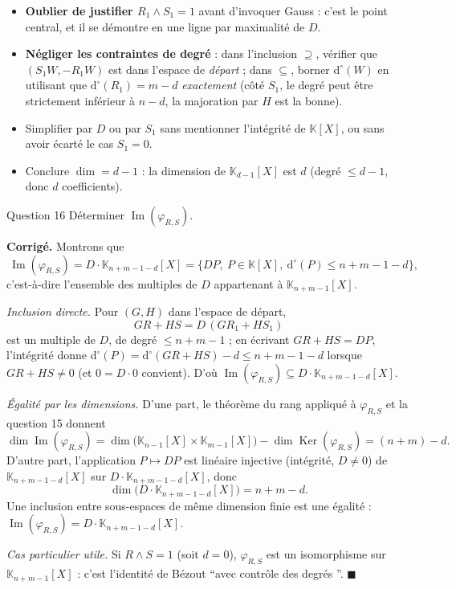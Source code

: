 \documentclass[11pt,a4paper]{article}
\newenvironment{corrige}
  {\par\medskip\noindent
   \begin{tcolorbox}[blanker, breakable,
     borderline west={2.5pt}{0pt}{vertP},
     left=10pt, top=2pt, bottom=2pt]
   {\color{vertP}\bfseries Corrigé.}\hspace{0.5em}\ignorespaces}
  {\hfill$\blacksquare$\end{tcolorbox}\medskip}
\newcommand{\og}{``}
\newcommand{\fg}{''}
\newcommand{\K}{\mathbb{K}}
\newcommand{\dg}[1]{\mathrm{d}^{\circ}\!\left(#1\right)}
\DeclareMathOperator{\Ker}{Ker}
\DeclareMathOperator{\Ima}{Im}
\begin{document}
\begin{pieges}
\begin{itemize}[leftmargin=1.4em, itemsep=2pt]
\item \textbf{Oublier de justifier $R_1\wedge S_1=1$} avant d'invoquer
Gauss : c'est le point central, et il se démontre en une ligne par
maximalité de $D$.
\item \textbf{Négliger les contraintes de degré} : dans l'inclusion
$\supseteq$, vérifier que $(S_1W,-R_1W)$ est dans l'espace de
\emph{départ} ; dans $\subseteq$, borner $\dg{W}$ en utilisant que
$\dg{R_1}=m-d$ \emph{exactement} (côté $S_1$, le degré peut être
strictement inférieur à $n-d$, la majoration par $H$ est la bonne).
\item Simplifier par $D$ ou par $S_1$ sans mentionner l'intégrité de
$\K[X]$, ou sans avoir écarté le cas $S_1=0$.
\item Conclure $\dim=d-1$ : la dimension de $\K_{d-1}[X]$ est $d$
(degré $\le d-1$, donc $d$ coefficients).
\end{itemize}
\end{pieges}

\begin{enonce}{Question 16}
Déterminer $\Ima(\varphi_{R,S})$.
\end{enonce}

\begin{corrige}
Montrons que
\[
\boxed{\ \Ima(\varphi_{R,S})
=D\cdot\K_{n+m-1-d}[X]
=\big\{DP,\ P\in\K[X],\ \dg{P}\le n+m-1-d\big\},\ }
\]
c'est-à-dire l'ensemble des multiples de $D$ appartenant à
$\K_{n+m-1}[X]$.

\emph{Inclusion directe.} Pour $(G,H)$ dans l'espace de départ,
\[
GR+HS=D\,(GR_1+HS_1)
\]
est un multiple de $D$, de degré $\le n+m-1$ ; en écrivant
$GR+HS=DP$, l'intégrité donne $\dg{P}=\dg{GR+HS}-d\le n+m-1-d$
lorsque $GR+HS\neq 0$ (et $0=D\cdot 0$ convient). D'où
$\Ima(\varphi_{R,S})\subseteq D\cdot\K_{n+m-1-d}[X]$.

\emph{Égalité par les dimensions.} D'une part, le théorème du rang
appliqué à $\varphi_{R,S}$ et la question 15 donnent
\[
\dim\Ima(\varphi_{R,S})
=\dim\big(\K_{n-1}[X]\times\K_{m-1}[X]\big)-\dim\Ker(\varphi_{R,S})
=(n+m)-d .
\]
D'autre part, l'application $P\mapsto DP$ est linéaire injective
(intégrité, $D\neq 0$) de $\K_{n+m-1-d}[X]$ sur
$D\cdot\K_{n+m-1-d}[X]$, donc
\[
\dim\big(D\cdot\K_{n+m-1-d}[X]\big)=n+m-d .
\]
Une inclusion entre sous-espaces de même dimension finie est une
égalité : $\Ima(\varphi_{R,S})=D\cdot\K_{n+m-1-d}[X]$.

\emph{Cas particulier utile.} Si $R\wedge S=1$ (soit $d=0$),
$\varphi_{R,S}$ est un isomorphisme sur $\K_{n+m-1}[X]$ : c'est
l'identité de Bézout \og avec contrôle des degrés \fg.
\end{corrige}
\end{document}
